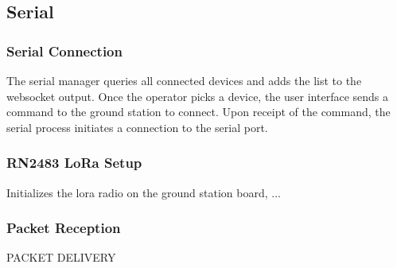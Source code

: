 \subsectionfont{\fontsize{14}{14}\selectfont}


\subsection{Serial}

\subsubsection{Serial Connection}
The serial manager queries all connected devices and adds the list to the websocket output. Once the operator picks a device, the user interface sends a command to the ground station to connect. Upon receipt of the command, the serial process initiates a connection to the serial port.

\subsubsection{RN2483 LoRa Setup}
Initializes the lora radio on the ground station board, ...

\subsubsection{Packet Reception}
PACKET DELIVERY\\
